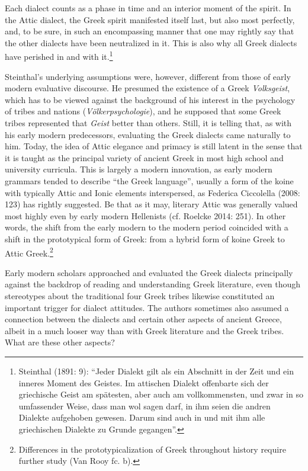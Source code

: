 \documentclass[12pt]{article}
\newenvironment{styleStandard}{\renewcommand\baselinestretch{1.25}\setlength\leftskip{0in}\setlength\rightskip{0in}\setlength\parindent{0.1972in}\setlength\parfillskip{0pt plus 1fil}\setlength\parskip{0in plus 1pt}\writerlistparindent\writerlistleftskip\leavevmode\normalfont\normalsize\writerlistlabel\ignorespaces}{\unskip\vspace{0in plus 1pt}\par}
\newenvironment{styleQuote}{\renewcommand\baselinestretch{1.25}\setlength\leftskip{0.3937in}\setlength\rightskip{0in}\setlength\parindent{0in}\setlength\parfillskip{0pt plus 1fil}\setlength\parskip{0.1665in plus 0.016649999in}\writerlistparindent\writerlistleftskip\leavevmode\normalfont\normalsize\writerlistlabel\ignorespaces}{\unskip\vspace{0.1665in plus 0.016649999in}\par}
\newcommand\writerlistleftskip{}
\newcommand\writerlistparindent{}
\newcommand\writerlistlabel{}
\begin{document}
\begin{styleQuote}
Each dialect counts as a phase in time and an interior moment of the spirit. In the Attic dialect, the Greek spirit manifested itself last, but also most perfectly, and, to be sure, in such an encompassing manner that one may rightly say that the other dialects have been neutralized in it. This is also why all Greek dialects have perished in and with it.\footnote{ Steinthal (1891: 9): “Jeder Dialekt gilt als ein Abschnitt in der Zeit und ein inneres Moment des Geistes. Im attischen Dialekt offenbarte sich der griechische Geist am spätesten, aber auch am vollkommensten, und zwar in so umfassender Weise, dass man wol sagen darf, in ihm seien die andren Dialekte aufgehoben gewesen. Darum sind auch in und mit ihm alle griechischen Dialekte zu Grunde gegangen”.}
\end{styleQuote}

\begin{styleStandard}
Steinthal’s underlying assumptions were, however, different from those of early modern evaluative discourse. He presumed the existence of a Greek \textit{Volksgeist}, which has to be viewed against the background of his interest in the psychology of tribes and nations (\textit{Völkerpsychologie}), and he supposed that some Greek tribes represented that \textit{Geist} better than others. Still, it is telling that, as with his early modern predecessors, evaluating the Greek dialects came naturally to him. Today, the idea of Attic elegance and primacy is still latent in the sense that it is taught as the principal variety of ancient Greek in most high school and university curricula. This is largely a modern innovation, as early modern grammars tended to describe “the Greek language”, usually a form of the koine with typically Attic and Ionic elements interspersed, as Federica Ciccolella (2008: 123) has rightly suggested. Be that as it may, literary Attic was generally valued most highly even by early modern Hellenists (cf. Roelcke 2014: 251). In other words, the shift from the early modern to the modern period coincided with a shift in the prototypical form of Greek: from a hybrid form of koine Greek to Attic Greek.\footnote{ Differences in the prototypicalization of Greek throughout history require further study (Van Rooy fc. b).}
\end{styleStandard}

\begin{styleStandard}
Early modern scholars approached and evaluated the Greek dialects principally against the backdrop of reading and understanding Greek literature, even though stereotypes about the traditional four Greek tribes likewise constituted an important trigger for dialect attitudes. The authors sometimes also assumed a connection between the dialects and certain other aspects of ancient Greece, albeit in a much looser way than with Greek literature and the Greek tribes. What are these other aspects?
\end{styleStandard}
\end{document}

